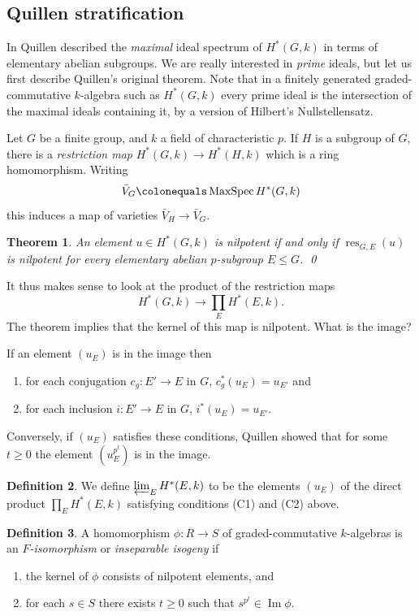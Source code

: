 \documentclass{amsart}[a4]
\newtheorem{theorem}{Theorem}[section]
\theoremstyle{definition}
\newtheorem{definition}[theorem]{Definition}
\theoremstyle{remark}
\numberwithin{equation}{section}
\renewcommand{\Im}{\operatorname{Im}}
\newcommand{\MaxSpec}{\operatorname{MaxSpec}}
\newcommand{\res}{\operatorname{res}}
\newcommand{\lto}{\longrightarrow}
\begin{document}
\subsection*{Quillen stratification}

In \cite{Quillen:1971b,Quillen:1971c} Quillen described the
\emph{maximal} ideal spectrum of
$H^*(G,k)$ in terms of elementary abelian subgroups.  We are really
interested in \emph{prime} ideals, but let us first describe Quillen's
original theorem. Note that in a finitely generated graded-commutative
$k$-algebra such as $H^*(G,k)$ every prime ideal is the intersection
of the maximal ideals containing it, by a version of Hilbert's
Nullstellensatz.

Let $G$ be a finite group, and $k$ a field of characteristic $p$. If
$H$ is a subgroup of $G$, there is a \emph{restriction
  map}  $H^*(G,k)\to H^*(H,k)$ which is a ring
homomorphism. Writing \[\bar V_G\colonequals\MaxSpec H^*(G,k)\] this induces a map of
varieties $\bar V_H\to \bar V_G$.

\begin{theorem}
An element $u\in H^*(G,k)$ is nilpotent if and only if $\res_{G,E}(u)$ is
nilpotent for every elementary abelian $p$-subgroup $E\le G$. \qed
\end{theorem}

It thus makes sense to look at the product of the restriction maps
\[ 
H^*(G,k) \lto \prod_E H^*(E,k). 
\]
The theorem implies that the kernel of this map is nilpotent.  What is the image?\medskip

If an element $(u_E)$ is in the image then
\begin{enumerate}
\item[(C1)] for each conjugation $c_g\colon E' \to E$ in $G$, 
$c_g^*(u_E)=u_{E'}$ and
\item[(C2)] for each inclusion $i\colon E' \to E$ in $G$, $i^*(u_E)=u_{E'}$.
\end{enumerate}

Conversely, if $(u_E)$ satisfies these conditions, Quillen showed
that for some $t\ge 0$ the element $(u_E^{p^t})$ is in the image.

\begin{definition}
We define $\varprojlim_{E} H^*(E,k)$ to be the elements $(u_E)$ of the direct product $\prod_E H^*(E,k)$ satisfying
conditions (C1) and (C2) above.
\end{definition}

\begin{definition}
A homomorphism $\phi\colon R\to S$ of graded-commutative $k$-algebras 
is an \emph{$F$-isomorphism} or 
\emph{inseparable isogeny} if
\begin{enumerate}
\item[(F1)] the kernel of $\phi$ consists of nilpotent elements, and
\item[(F2)] for each $s\in S$ there exists $t\ge 0$ such that $s^{p^t}\in\Im \phi$.
\end{enumerate}
\end{definition}
\end{document}
